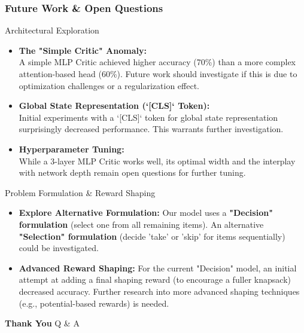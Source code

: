 \begin{frame}
    \frametitle{Future Work \& Open Questions}

    \begin{block}{Architectural Exploration}
        \begin{itemize}
            \item \textbf{The "Simple Critic" Anomaly:} \\
            A simple MLP Critic achieved higher accuracy (70\%) than a more complex attention-based head (60\%). Future work should investigate if this is due to optimization challenges or a regularization effect. \vspace{1em}
            
            \item \textbf{Global State Representation (`[CLS]` Token):} \\
            Initial experiments with a `[CLS]` token for global state representation surprisingly decreased performance. This warrants further investigation. \vspace{1em}
            
            \item \textbf{Hyperparameter Tuning:} \\
            While a 3-layer MLP Critic works well, its optimal width and the interplay with network depth remain open questions for further tuning.
        \end{itemize}
    \end{block}

    \begin{alertblock}{Problem Formulation \& Reward Shaping}
        \begin{itemize}
            \item \textbf{Explore Alternative Formulation:} Our model uses a \textbf{"Decision" formulation} (select one from all remaining items). An alternative \textbf{"Selection" formulation} (decide 'take' or 'skip' for items sequentially) could be investigated. \vspace{1em}

            \item \textbf{Advanced Reward Shaping:} For the current "Decision" model, an initial attempt at adding a final shaping reward (to encourage a fuller knapsack) decreased accuracy. Further research into more advanced shaping techniques (e.g., potential-based rewards) is needed.
        \end{itemize}
    \end{alertblock}
\end{frame}


\begin{frame}
    \centering
    \Huge{\textbf{Thank You}}
    \vspace{2em}
    \LARGE{Q \& A}
\end{frame}